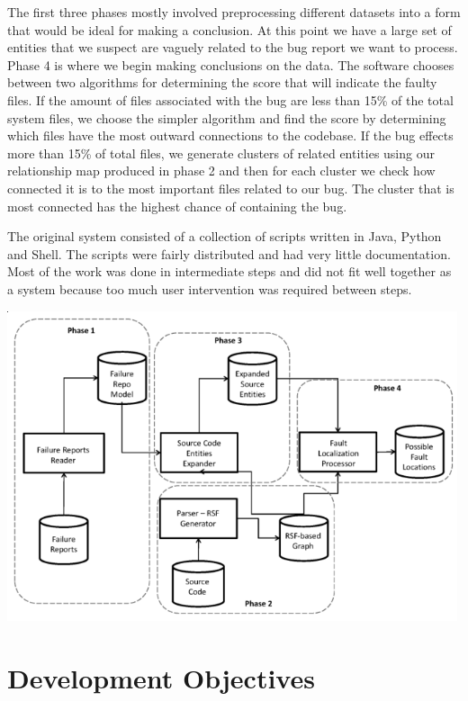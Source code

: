 \documentclass[12pt]{article}
\begin{document}
The first three phases mostly involved preprocessing different datasets
into a form that would be ideal for making a conclusion. At this point
we have a large set of entities that we suspect are vaguely related to
the bug report we want to process. Phase 4 is where we begin making
conclusions on the data. The software chooses between two algorithms for
determining the score that will indicate the faulty files. If the amount
of files associated with the bug are less than 15\% of the total system
files, we choose the simpler algorithm and find the score by determining
which files have the most outward connections to the codebase. If the
bug effects more than 15\% of total files, we generate clusters of
related entities using our relationship map produced in phase 2 and then
for each cluster we check how connected it is to the most important
files related to our bug. The cluster that is most connected has the
highest chance of containing the bug.

The original system consisted of a collection of scripts written in
Java, Python and Shell. The scripts were fairly distributed and had very
little documentation. Most of the work was done in intermediate steps
and did not fit well together as a system because too much user
intervention was required between steps.

\includegraphics[width=500px]{../images/FaultPhases}

\hypertarget{development-objectives}{%
\section{Development Objectives}\label{development-objectives}}
\end{document}
